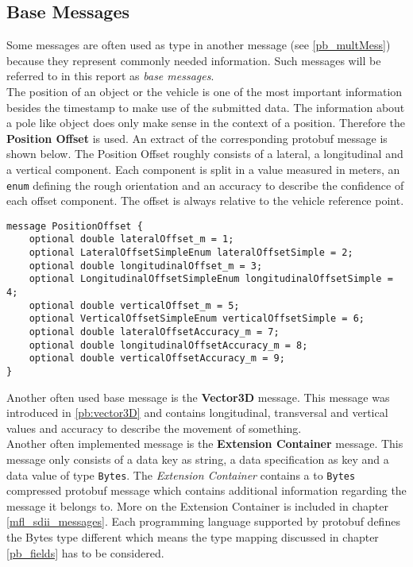 \subsection{Base Messages}
\label{mfl_base_messages}
Some messages are often used as type in another message (see \ref{pb_multMess}) because they represent commonly needed information. Such messages will be referred to in this report as \emph{base messages}.\\
The position of an object or the vehicle is one of the most important information besides the timestamp to make use of the submitted data. The information about a pole like object does only make sense in the context of a position. Therefore the \textbf{Position Offset} is used. An extract of the corresponding protobuf message is shown below. The Position Offset roughly consists of a lateral, a longitudinal and a vertical component. Each component is split in a value measured in meters, an \verb|enum| defining the rough orientation and an accuracy to describe the confidence of each offset component. The offset is always relative to the vehicle reference point.
\begin{lstlisting}[backgroundcolor=\color{lightlightgray}, title={Position Offset protobuf definition}]
message PositionOffset {
    optional double lateralOffset_m = 1;
    optional LateralOffsetSimpleEnum lateralOffsetSimple = 2;
    optional double longitudinalOffset_m = 3;
    optional LongitudinalOffsetSimpleEnum longitudinalOffsetSimple = 4;
    optional double verticalOffset_m = 5;
    optional VerticalOffsetSimpleEnum verticalOffsetSimple = 6;
    optional double lateralOffsetAccuracy_m = 7;
    optional double longitudinalOffsetAccuracy_m = 8;
    optional double verticalOffsetAccuracy_m = 9;
}
\end{lstlisting}
Another often used base message is the \textbf{Vector3D} message. This message was introduced in \ref{pb:vector3D} and contains longitudinal, transversal and vertical values and accuracy to describe the movement of something.\\
Another often implemented message is the \textbf{Extension Container} message. This message only consists of a data key as string, a data specification as key and a data value of type \verb|Bytes|. The \emph{Extension Container} contains a to \verb|Bytes| compressed protobuf message which contains additional information regarding the message it belongs to. More on the Extension Container is included in chapter \ref{mfl_sdii_messages}. Each programming language supported by protobuf defines the Bytes type different which means the type mapping discussed in chapter \ref{pb_fields} has to be considered.
